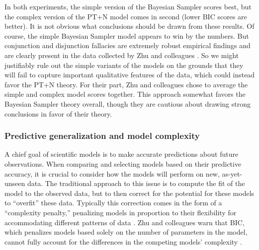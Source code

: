 \documentclass[
  man,floatsintext]{apa6}
\begin{document}
In both experiments, the simple version of the Bayesian Sampler scores best, but the complex version of the PT+N model comes in second (lower BIC scores are better). It is not obvious what conclusions should be drawn from these results. Of course, the simple Bayesian Sampler model appears to win by the numbers. But conjunction and disjunction fallacies are extremely robust empirical findings \autocite{mellers.etal2001,sides.etal2002} and are clearly present in the data collected by Zhu and colleagues \autocite*{zhu.etal2020}. So we might justifiably rule out the simple variants of the models on the grounds that they will fail to capture important qualitative features of the data, which could instead favor the PT+N theory. For their part, Zhu and colleagues \autocite*{zhu.etal2020} chose to average the simple and complex model scores together. This approach somewhat favors the Bayesian Sampler theory overall, though they are cautious about drawing strong conclusions in favor of their theory.

\hypertarget{predictive-generalization-and-model-complexity}{%
\subsubsection{Predictive generalization and model complexity}\label{predictive-generalization-and-model-complexity}}

A chief goal of scientific models is to make accurate predictions about future observations. When comparing and selecting models based on their predictive accuracy, it is crucial to consider how the models will perform on new, as-yet-unseen data. The traditional approach to this issue is to compute the fit of the model to the observed data, but to then correct for the potential for these models to ``overfit'' these data. Typically this correction comes in the form of a ``complexity penalty,'' penalizing models in proportion to their flexibility for accommodating different patterns of data \autocite{gelman.etal2014}. Zhu and colleagues \autocite*{zhu.etal2020} warn that BIC, which penalizes models based solely on the number of parameters in the model, cannot fully account for the differences in the competing models' complexity \autocite[also see][]{piantadosi2018}.
\end{document}
